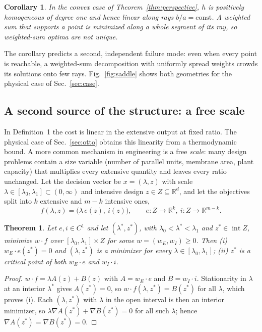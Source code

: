 \documentclass[journal]{IEEEtran}
\newtheorem{theorem}{Theorem}
\newtheorem{corollary}{Corollary}
\theoremstyle{remark}
\begin{document}
\begin{corollary}
\label{cor:degenerate}
In the convex case of Theorem~\ref{thm:perspective}, $h$ is positively homogeneous of degree one and
hence linear along rays $b/a = \text{const}$. A weighted sum that supports a point is minimized along
a whole segment of its ray, so weighted-sum optima are not unique.
\end{corollary}

The corollary predicts a second, independent failure mode: even when every point is reachable, a
weighted-sum decomposition with uniformly spread weights crowds its solutions onto few rays.
Fig.~\ref{fig:saddle} shows both geometries for the physical case of Sec.~\ref{sec:case}.

\subsection{A second source of the structure: a free scale}
\label{sec:freescale}

In Definition~1 the cost is linear in the extensive output at fixed ratio. The physical case of
Sec.~\ref{sec:otto} obtains this linearity from a thermodynamic bound. A more common mechanism in
engineering is a free \emph{scale}: many design problems contain a size variable (number of parallel
units, membrane area, plant capacity) that multiplies every extensive quantity and leaves every ratio
unchanged. Let the decision vector be $x = (\lambda, z)$ with scale $\lambda \in [\lambda_0,\lambda_1]
\subset (0,\infty)$ and intensive design $z \in Z \subseteq \mathbb{R}^d$, and let the objectives split
into $k$ extensive and $m-k$ intensive ones,
\begin{equation}
f(\lambda, z) = \bigl(\lambda\, e(z),\ i(z)\bigr), \qquad e: Z \to \mathbb{R}^k,\ i: Z \to \mathbb{R}^{m-k}.
\label{eq:scale}
\end{equation}

\begin{theorem}
\label{thm:scale}
Let $e, i \in C^1$ and let $(\lambda^*, z^*)$, with $\lambda_0 < \lambda^* < \lambda_1$ and
$z^* \in \operatorname{int} Z$, minimize $w\cdot f$ over $[\lambda_0,\lambda_1]\times Z$ for some
$w = (w_E, w_I) \ge 0$. Then (i) $w_E\cdot e(z^*) = 0$ and $(\lambda, z^*)$ is a minimizer for every
$\lambda \in [\lambda_0,\lambda_1]$; (ii) $z^*$ is a critical point of both $w_E\cdot e$ and $w_I\cdot i$.
\end{theorem}

\begin{proof}
$w\cdot f = \lambda A(z) + B(z)$ with $A = w_E\cdot e$ and $B = w_I\cdot i$. Stationarity in $\lambda$
at an interior $\lambda^*$ gives $A(z^*) = 0$, so $w\cdot f(\lambda, z^*) = B(z^*)$ for all $\lambda$,
which proves (i). Each $(\lambda, z^*)$ with $\lambda$ in the open interval is then an interior
minimizer, so $\lambda\nabla A(z^*) + \nabla B(z^*) = 0$ for all such $\lambda$; hence
$\nabla A(z^*) = \nabla B(z^*) = 0$.
\end{proof}
\end{document}
